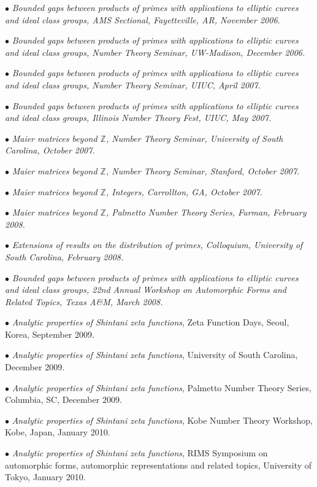 \documentclass{article}
\newcommand{\categorywidth}{1in}        %
\newcommand{\categorysep}{5pt}
\newcommand{\catlistlabel}[1]%
{\raisebox{0pt}[1ex][0pt]{\makebox[\labelwidth][l]%
    {\parbox[t]{\labelwidth}{\hspace{0pt}\textbf{#1}}}}}
\newenvironment{categories}{\begin{list}{}{
      \setlength{\labelwidth}{\categorywidth}
      \setlength{\leftmargin}{\labelwidth}
      \addtolength{\leftmargin}{\labelsep}
      \setlength{\topsep}{20pt}
      \setlength{\itemsep}{\categorysep}
      \renewcommand{\makelabel}{\catlistlabel}
      }}{\end{list}}
\begin{document}
\begin{flushleft}
\begin{categories}
{$\bullet$ {\itshape Bounded gaps between products of primes with applications to elliptic curves
and ideal class groups\upshape, AMS Sectional, Fayetteville, AR, November 2006.}

$\bullet$ {\itshape Bounded gaps between products of primes with applications to elliptic curves
and ideal class groups\upshape, Number Theory Seminar, UW-Madison, December 2006.}

$\bullet$ {\itshape Bounded gaps between products of primes with applications to elliptic curves
and ideal class groups\upshape, Number Theory Seminar, UIUC, April 2007.}

$\bullet$ {\itshape Bounded gaps between products of primes with applications to elliptic curves
and ideal class groups\upshape, Illinois Number Theory Fest, UIUC, May 2007.}

$\bullet$ {\itshape Maier matrices beyond $\mathbb{Z}$\upshape, Number Theory Seminar,
University of South Carolina, October 2007.}

$\bullet$ {\itshape Maier matrices beyond $\mathbb{Z}$\upshape, Number Theory Seminar,
Stanford, October 2007.}

$\bullet$ {\itshape Maier matrices beyond $\mathbb{Z}$\upshape, Integers, Carrollton, GA, October 2007.}

$\bullet$ {\itshape Maier matrices beyond $\mathbb{Z}$\upshape,
Palmetto Number Theory Series, Furman, February 2008.}

$\bullet$ {\itshape Extensions of results on the distribution of primes\upshape, Colloquium, University of South Carolina, February 2008.}

$\bullet$ {\itshape Bounded gaps between products of primes with applications to elliptic curves and ideal class groups\upshape, 22nd Annual Workshop on Automorphic
Forms and Related Topics, Texas A\&M, March 2008.}

$\bullet$ {\itshape Analytic properties of Shintani zeta functions}, Zeta Function Days,
Seoul, Korea, September 2009.

$\bullet$ {\itshape Analytic properties of Shintani zeta functions}, University of South Carolina,
December 2009.

$\bullet$ {\itshape Analytic properties of Shintani zeta functions}, Palmetto Number Theory Series,
Columbia, SC, December 2009.

$\bullet$ {\itshape Analytic properties of Shintani zeta functions}, Kobe Number Theory Workshop,
Kobe, Japan, January 2010.

$\bullet$ {\itshape Analytic properties of Shintani zeta functions}, RIMS Symposium on automorphic
forms, automorphic representations and related topics, University of Tokyo, January 2010.

}
\end{categories}
\end{flushleft}
\end{document}

